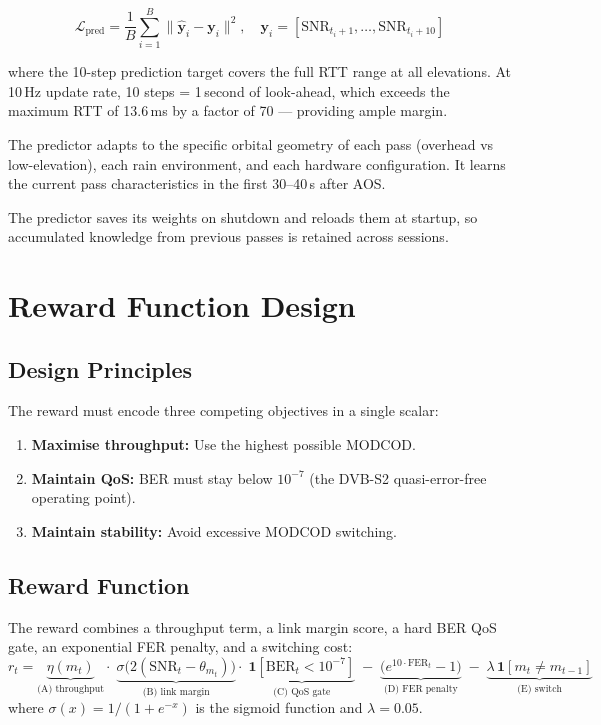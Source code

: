 \documentclass[12pt,a4paper]{report}
\begin{document}
\begin{equation}
    \mathcal{L}_\text{pred} = \frac{1}{B} \sum_{i=1}^{B}
    \bigl\|\hat{\mathbf{y}}_i - \mathbf{y}_i\bigr\|^2,
    \quad
    \mathbf{y}_i = [\text{SNR}_{t_i+1},\ldots,\text{SNR}_{t_i+10}]
\end{equation}

where the 10-step prediction target covers the full RTT range at all
elevations. At 10\,Hz update rate, 10 steps = 1\,second of look-ahead,
which exceeds the maximum RTT of 13.6\,ms by a factor of 70 --- providing
ample margin.

The predictor adapts to the specific orbital geometry of each pass (overhead
vs low-elevation), each rain environment, and each hardware configuration.
It learns the current pass characteristics in the first 30--40\,s after AOS.

The predictor saves its weights on shutdown and reloads them at startup,
so accumulated knowledge from previous passes is retained across sessions.

\section{Reward Function Design}
\label{sec:reward}

\subsection{Design Principles}

The reward must encode three competing objectives in a single scalar:
\begin{enumerate}[nosep]
    \item \textbf{Maximise throughput:} Use the highest possible MODCOD.
    \item \textbf{Maintain QoS:} BER must stay below $10^{-7}$ (the
          DVB-S2 quasi-error-free operating point).
    \item \textbf{Maintain stability:} Avoid excessive MODCOD switching.
\end{enumerate}

\subsection{Reward Function}
\label{sec:reward_formula}

The reward combines a throughput term, a link margin score, a hard BER QoS
gate, an exponential FER penalty, and a switching cost:
\begin{equation}
    r_t =
    \underbrace{\eta(m_t)}_{\text{(A) throughput}}
    \cdot\;
    \underbrace{\sigma\!\bigl(2(\text{SNR}_t - \theta_{m_t})\bigr)}_{\text{(B) link margin}}
    \cdot\;
    \underbrace{\mathbf{1}[\text{BER}_t < 10^{-7}]}_{\text{(C) QoS gate}}
    \;-\;
    \underbrace{\bigl(e^{10\cdot\text{FER}_t} - 1\bigr)}_{\text{(D) FER penalty}}
    \;-\;
    \underbrace{\lambda\,\mathbf{1}[m_t \neq m_{t-1}]}_{\text{(E) switch}}
\end{equation}
where $\sigma(x) = 1/(1+e^{-x})$ is the sigmoid function and $\lambda = 0.05$.
\end{document}
